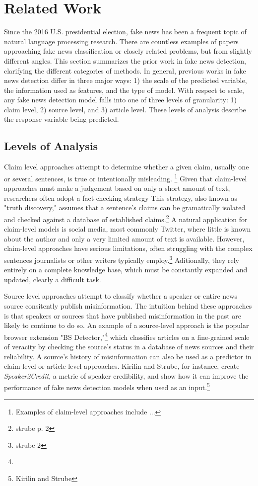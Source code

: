 \documentclass[../thesis.tex]{subfiles}
\begin{document}
\chapter{Related Work}
\label{ch:relatedwork}


Since the 2016 U.S. presidential election, fake news has been a frequent topic of natural language processing research. There are countless examples of papers approaching fake news classification or closely related problems, but from slightly different angles. This section summarizes the prior work in fake news detection, clarifying the different categories of methods. In general, previous works in fake news detection differ in three major ways: 1) the scale of the predicted variable, the information used as features, and the type of model. With respect to scale, any fake news detection model falls into one of three levels of granularity: 1) claim level, 2) source level, and 3) article level. These levels of analysis describe the response variable being predicted.

\section{Levels of Analysis}

Claim level approaches attempt to determine whether a given claim, usually one or several sentences, is true or intentionally misleading. \footnote{Examples of claim-level approaches include ...} Given that claim-level approaches must make a judgement based on only a short amount of text, researchers often adopt a fact-checking strategy This strategy, also known as "truth discovery," assumes that a sentence's claims can be gramatically isolated and checked against a database of established claims.\footnote{strube p. 2} A natural application for claim-level models is social media, most commonly Twitter, where little is known about the author and only a very limited amount of text is available. However, claim-level approaches have serious limitations, often struggling with the complex sentences journalists or other writers typically employ.\footnote{strube 2} Aditionally, they rely entirely on a complete knowledge base, which must be constantly expanded and updated, clearly a difficult task.

Source level approaches attempt to classify whether a speaker or entire news source consitently publish misinformation. The intuition behind these approaches is that speakers or sources that have published misinformation in the past are likely to continue to do so. An example of a source-level approach is the popular browser extension "BS Detector,"\footnote{} which classifies articles on a fine-grained scale of veracity by checking the source's status in a database of news sources and their reliability. A source's history of misinformation can also be used as a predictor in claim-level or article level approaches. Kirilin and Strube, for instance, create \emph{Speaker2Credit}, a metric of speaker credibility, and show how it can improve the performance of fake news detection models when used as an input.\footnote{Kirilin and Strube}
\end{document}
